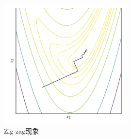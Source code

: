 \begin{figure}[h!]
\caption{Zig zag现象}
\centering
\includegraphics[width=0.6\textwidth]{img/zigzag.png}
\end{figure}
